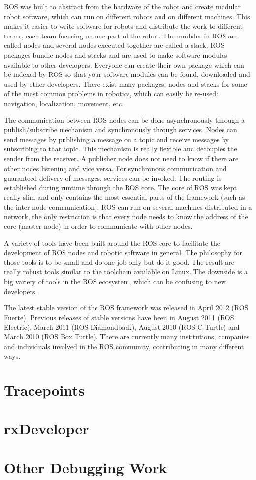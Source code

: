 ROS was built to abstract from the hardware of the robot and create modular robot software, which can run on different robots and on different machines. This makes it easier to write software for robots and distribute the work to different teams, each team focusing on one part of the robot. The modules in ROS are called nodes and several nodes executed together are called a stack. ROS packages bundle nodes and stacks and are used to make software modules available to other developers. Everyone can create their own package which can be indexed by ROS so that your software modules can be found, downloaded and used by other developers. There exist many packages, nodes and stacks for some of the most common problems in robotics, which can easily be re-used: navigation, localization, movement, etc.

The communication between ROS nodes can be done asynchronously through a publish/subscribe mechanism and synchronously through services. Nodes can send messages by publishing a message on a topic and receive messages by subscribing to that topic. This mechanism is really flexible and decouples the sender from the receiver. A publisher node does not need to know if there are other nodes listening and vice versa. For synchronous communication and guaranteed delivery of messages, services can be invoked. The routing is established during runtime through the ROS core. The core of ROS was kept really slim and only contains the most essential parts of the framework (such as the inter node communication). ROS can run on several machines distributed in a network, the only restriction is that every node needs to know the address of the core (master node) in order to communicate with other nodes.

A variety of tools have been built around the ROS core to facilitate the development of ROS nodes and robotic software in general. The philosophy for those tools is to be small and do one job only but do it good. The result are really robust tools similar to the toolchain available on Linux. The downside is a big variety of tools in the ROS ecosystem, which can be confusing to new developers.

The latest stable version of the ROS framework was released in April 2012 (ROS Fuerte). Previous releases of stable versions have been in August 2011 (ROS Electric), March 2011 (ROS Diamondback), August 2010 (ROS C Turtle) and March 2010 (ROS Box Turtle). There are currently many institutions, companies and individuals involved in the ROS community, contributing in many different ways.

\section{Tracepoints}
\section{rxDeveloper}
\section{Other Debugging Work}

